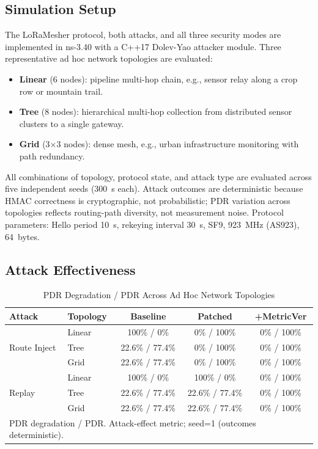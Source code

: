 \documentclass[preprint,12pt]{elsarticle}
\begin{document}
\subsection{Simulation Setup}

The LoRaMesher protocol, both attacks, and all three security modes
are implemented in ns-3.40 with a C++17 Dolev-Yao attacker module.
Three representative ad hoc network topologies are evaluated:

\begin{itemize}
  \item \textbf{Linear} (6 nodes): pipeline multi-hop chain, e.g.,
    sensor relay along a crop row or mountain trail.
  \item \textbf{Tree} (8 nodes): hierarchical multi-hop collection
    from distributed sensor clusters to a single gateway.
  \item \textbf{Grid} (3×3 nodes): dense mesh, e.g., urban
    infrastructure monitoring with path redundancy.
\end{itemize}

All combinations of topology, protocol state, and attack type
are evaluated across five independent seeds (300~s each).
Attack outcomes are deterministic because HMAC correctness is
cryptographic, not probabilistic; PDR variation across topologies
reflects routing-path diversity, not measurement noise.
Protocol parameters: Hello period 10~s, rekeying interval 30~s,
SF9, 923~MHz (AS923), 64~bytes.

\subsection{Attack Effectiveness}

\begin{table}[t]
  \centering
  \caption{PDR Degradation / PDR Across Ad Hoc Network Topologies}
  \label{tab:attacks}
  \setlength{\tabcolsep}{4pt}
  \begin{tabular}{llccc}
    \toprule
    \textbf{Attack} & \textbf{Topology} &
      \textbf{Baseline} & \textbf{Patched} & \textbf{+MetricVer} \\
    \midrule
    \multirow{3}{*}{Route Inject}
      & Linear & 100\% / 0\%       & 0\% / 100\% & 0\% / 100\% \\
      & Tree   & 22.6\% / 77.4\%   & 0\% / 100\% & 0\% / 100\% \\
      & Grid   & 22.6\% / 77.4\%   & 0\% / 100\% & 0\% / 100\% \\
    \midrule
    \multirow{3}{*}{Replay}
      & Linear & 100\% / 0\%       & 100\% / 0\%      & 0\% / 100\% \\
      & Tree   & 22.6\% / 77.4\%   & 22.6\% / 77.4\%  & 0\% / 100\% \\
      & Grid   & 22.6\% / 77.4\%   & 22.6\% / 77.4\%  & 0\% / 100\% \\
    \bottomrule
    \multicolumn{5}{l}{\footnotesize PDR degradation / PDR. Attack-effect metric; seed=1 (outcomes deterministic).}
  \end{tabular}
\end{table}
\end{document}
